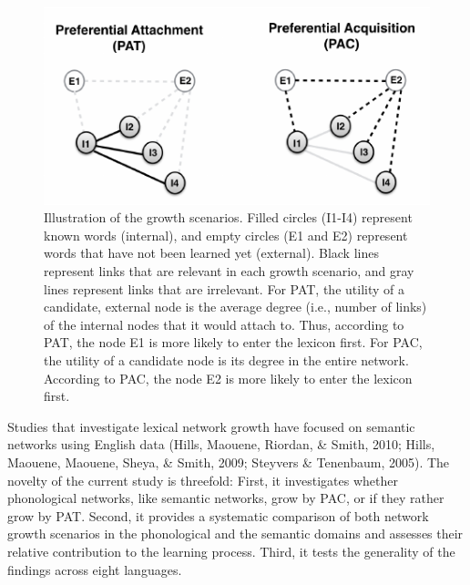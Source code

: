 \documentclass[10pt, letterpaper]{article}
\newenvironment{CodeChunk}{}{}
\begin{document}
\begin{CodeChunk}
\begin{figure}[H]

{\centering \includegraphics{figs/growth-1} 

}

\caption{\label{fig:growth}Illustration of the growth scenarios. Filled circles (I1-I4) represent known words (internal), and empty circles (E1 and E2) represent words that have not been learned yet (external). Black lines represent links that are relevant in each growth scenario, and gray lines represent links that are irrelevant. For PAT, the utility of a candidate, external node is the average degree (i.e., number of links) of the internal nodes that it would attach to. Thus, according to PAT, the node E1 is more likely to enter the lexicon first. For PAC, the utility of a candidate node is its degree in the entire network. According to PAC, the node E2 is more likely to enter the lexicon first.}\label{fig:growth}
\end{figure}
\end{CodeChunk}

Studies that investigate lexical network growth have focused on semantic
networks using English data (Hills, Maouene, Riordan, \& Smith, 2010;
Hills, Maouene, Maouene, Sheya, \& Smith, 2009; Steyvers \& Tenenbaum,
2005). The novelty of the current study is threefold: First, it
investigates whether phonological networks, like semantic networks, grow
by PAC, or if they rather grow by PAT. Second, it provides a systematic
comparison of both network growth scenarios in the phonological and the
semantic domains and assesses their relative contribution to the
learning process. Third, it tests the generality of the findings across
eight languages.
\end{document}
